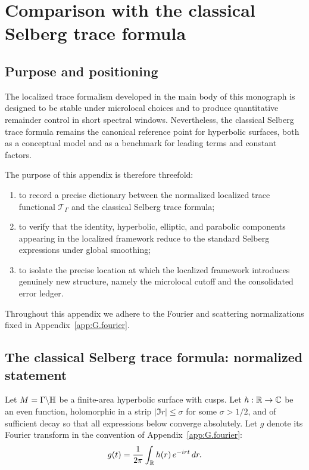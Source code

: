 
\appendix
\chapter{Comparison with the classical Selberg trace formula}
\label{app:H.selberg}

\section{Purpose and positioning}
\label{sec:H.purpose}

The localized trace formalism developed in the main body of this monograph is designed to be stable under microlocal
choices and to produce quantitative remainder control in short spectral windows.  Nevertheless, the classical Selberg
trace formula remains the canonical reference point for hyperbolic surfaces, both as a conceptual model and as a
benchmark for leading terms and constant factors.

The purpose of this appendix is therefore threefold:
\begin{enumerate}
\item to record a precise dictionary between the normalized localized trace functional $\mathcal{T}_\Gamma$ and the
classical Selberg trace formula;
\item to verify that the identity, hyperbolic, elliptic, and parabolic components appearing in the localized framework
reduce to the standard Selberg expressions under global smoothing;
\item to isolate the precise location at which the localized framework introduces genuinely new structure, namely the
microlocal cutoff and the consolidated error ledger.
\end{enumerate}

Throughout this appendix we adhere to the Fourier and scattering normalizations fixed in
Appendix~\ref{app:G.fourier}.

\section{The classical Selberg trace formula: normalized statement}
\label{sec:H.classical}

Let $M=\Gamma\backslash\mathbb{H}$ be a finite-area hyperbolic surface with cusps.  Let $h:\mathbb{R}\to\mathbb{C}$ be an even function,
holomorphic in a strip $|\Im r|\le \sigma$ for some $\sigma>1/2$, and of sufficient decay so that all expressions below
converge absolutely.  Let $g$ denote its Fourier transform in the convention of
Appendix~\ref{app:G.fourier}:
\begin{equation}\label{eq:H.g.def}
g(t)
=
\frac{1}{2\pi}\int_{\mathbb{R}} h(r)\,e^{-irt}\,dr.
\end{equation}

